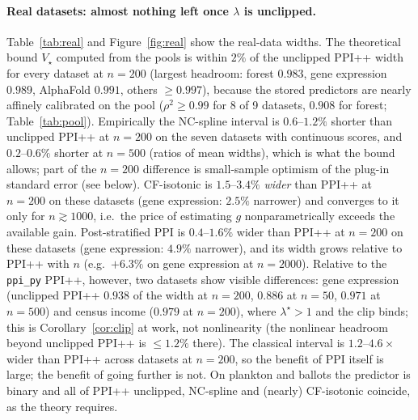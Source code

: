 \documentclass{article}
\begin{document}
\paragraph{Real datasets: almost nothing left once $\lambda$ is unclipped.}
Table~\ref{tab:real} and Figure~\ref{fig:real} show the real-data widths. The theoretical bound $V_\star$ computed from the pools is within $2\%$ of the unclipped PPI++ width for every dataset at $n=200$ (largest headroom: forest $0.983$, gene expression $0.989$, AlphaFold $0.991$, others $\ge0.997$), because the stored predictors are nearly affinely calibrated on the pool ($\rho^2\ge0.99$ for 8 of 9 datasets, $0.908$ for forest; Table~\ref{tab:pool}). Empirically the NC-spline interval is $0.6$--$1.2\%$ shorter than unclipped PPI++ at $n=200$ on the seven datasets with continuous scores, and $0.2$--$0.6\%$ shorter at $n=500$ (ratios of mean widths), which is what the bound allows; part of the $n=200$ difference is small-sample optimism of the plug-in standard error (see below). CF-isotonic is $1.5$--$3.4\%$ \emph{wider} than PPI++ at $n=200$ on these datasets (gene expression: $2.5\%$ narrower) and converges to it only for $n\gtrsim1000$, i.e.\ the price of estimating $g$ nonparametrically exceeds the available gain. Post-stratified PPI is $0.4$--$1.6\%$ wider than PPI++ at $n=200$ on these datasets (gene expression: $4.9\%$ narrower), and its width grows relative to PPI++ with $n$ (e.g.\ $+6.3\%$ on gene expression at $n=2000$). Relative to the \texttt{ppi\_py} PPI++, however, two datasets show visible differences: gene expression (unclipped PPI++ $0.938$ of the width at $n=200$, $0.886$ at $n=50$, $0.971$ at $n=500$) and census income ($0.979$ at $n=200$), where $\lambda^\star>1$ and the clip binds; this is Corollary~\ref{cor:clip} at work, not nonlinearity (the nonlinear headroom beyond unclipped PPI++ is $\le1.2\%$ there). The classical interval is $1.2$--$4.6\times$ wider than PPI++ across datasets at $n=200$, so the benefit of PPI itself is large; the benefit of going further is not. On plankton and ballots the predictor is binary and all of PPI++ unclipped, NC-spline and (nearly) CF-isotonic coincide, as the theory requires.

\begin{table}[t]
\centering\small
\caption{Real datasets: mean CI width relative to PPI++ (\texttt{ppi\_py}) (ratio of paired widths averaged over $R=2000$ resamples, $N=10^4$). Bound: asymptotic efficiency bound at that $n$. Values below 1 are not gains if coverage is lost; see Table~\ref{tab:cover}.}\label{tab:real}
\resizebox{\linewidth}{!}{}
\end{table}
\end{document}
